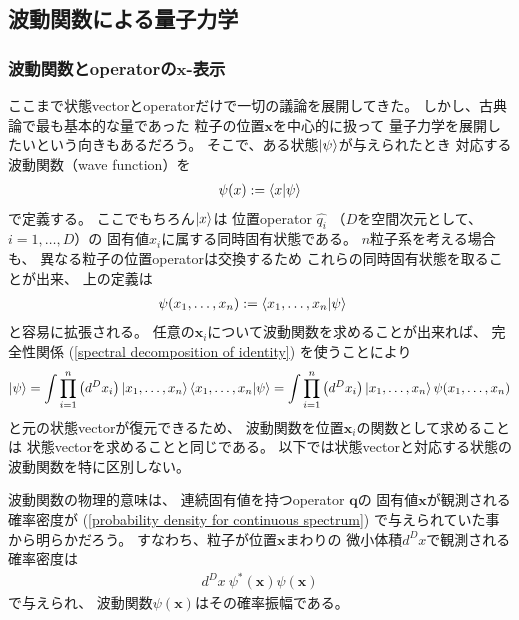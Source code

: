 \subsection{波動関数による量子力学}

\subsubsection{波動関数とoperatorの$\bm{x}$-表示}

ここまで状態vectorとoperatorだけで一切の議論を展開してきた。
しかし、古典論で最も基本的な量であった
粒子の位置$\bm{x}$を中心的に扱って
量子力学を展開したいという向きもあるだろう。
そこで、ある状態$\ket{ \psi }$が与えられたとき
対応する波動関数（wave function）を
\begin{align}
    \psi(x) := \braket{ x | \psi }
\label{wave function as position rep of ket vector}
\end{align}
で定義する。
ここでもちろん$\ket{ x }$は
位置operator $\hat{ q_i }$
（$D$を空間次元として、$i = 1,\dots,D$）の
固有値$x_i$に属する同時固有状態である。
$n$粒子系を考える場合も、
異なる粒子の位置operatorは交換するため
これらの同時固有状態を取ることが出来、
上の定義は
\begin{align}
    \psi(x_1, \dots, x_n)
    &:=
    \braket{ x_1, \dots, x_n | \psi }
\end{align}
と容易に拡張される。
任意の$\bm{x}_i$について波動関数を求めることが出来れば、
完全性関係
(\ref{spectral decomposition of identity})
を使うことにより
\begin{align}
    \ket{ \psi }
    =
    \int \prod_{i = 1}^n
    \left(
        d^D x_i
    \right)
    \ket{ x_1, \dots, x_n }
    \braket{ x_1, \dots, x_n | \psi }
    =
    \int \prod_{i = 1}^n
    \left(
        d^D x_i
    \right)
    \ket{ x_1, \dots, x_n }
    \psi( x_1, \dots, x_n )
\end{align}
と元の状態vectorが復元できるため、
波動関数を位置$\bm{x}_i$の関数として求めることは
状態vectorを求めることと同じである。
以下では状態vectorと対応する状態の波動関数を特に区別しない。

波動関数の物理的意味は、
連続固有値を持つoperator $\bm{q}$の
固有値$\bm{x}$が観測される確率密度が
(\ref{probability density for continuous spectrum})
で与えられていた事から明らかだろう。
すなわち、粒子が位置$\bm{x}$まわりの
微小体積$d^D x$で観測される確率密度は
\begin{align}
    d^D x\ 
    \psi^*(\bm{x}) \psi(\bm{x})
\end{align}
で与えられ、
波動関数$\psi(\bm{x})$はその確率振幅である。

